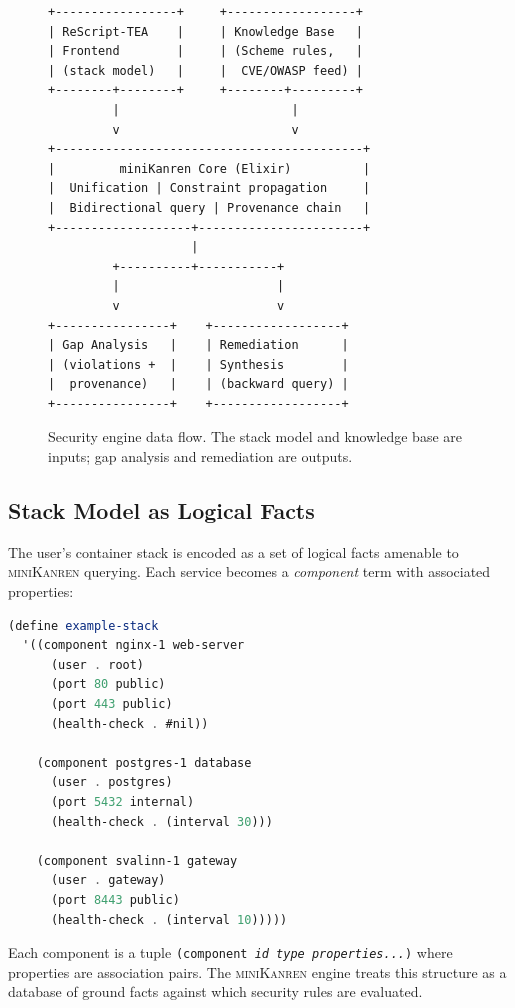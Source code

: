 \documentclass[11pt,twocolumn]{article}
\newcommand{\minikanren}{\textsc{miniKanren}\xspace}
\begin{document}
\begin{figure}[t]
\centering
\small
\begin{verbatim}
+-----------------+     +------------------+
| ReScript-TEA    |     | Knowledge Base   |
| Frontend        |     | (Scheme rules,   |
| (stack model)   |     |  CVE/OWASP feed) |
+--------+--------+     +--------+---------+
         |                        |
         v                        v
+-------------------------------------------+
|         miniKanren Core (Elixir)          |
|  Unification | Constraint propagation     |
|  Bidirectional query | Provenance chain   |
+-------------------+-----------------------+
                    |
         +----------+-----------+
         |                      |
         v                      v
+----------------+    +------------------+
| Gap Analysis   |    | Remediation      |
| (violations +  |    | Synthesis        |
|  provenance)   |    | (backward query) |
+----------------+    +------------------+
\end{verbatim}
\caption{Security engine data flow. The stack model and knowledge base
are inputs; gap analysis and remediation are outputs.}
\label{fig:engine-arch}
\end{figure}

\subsection{Stack Model as Logical Facts}
\label{sec:engine-model}

The user's container stack is encoded as a set of logical facts
amenable to \minikanren querying. Each service becomes a \emph{component}
term with associated properties:

\begin{lstlisting}[language=Scheme,caption={Stack model as logical
facts (Guile Scheme representation).},label=lst:stack-model]
(define example-stack
  '((component nginx-1 web-server
      (user . root)
      (port 80 public)
      (port 443 public)
      (health-check . #nil))

    (component postgres-1 database
      (user . postgres)
      (port 5432 internal)
      (health-check . (interval 30)))

    (component svalinn-1 gateway
      (user . gateway)
      (port 8443 public)
      (health-check . (interval 10)))))
\end{lstlisting}

Each component is a tuple \texttt{(component \emph{id type}
\emph{properties...})} where properties are association pairs. The
\minikanren engine treats this structure as a database of ground
facts against which security rules are evaluated.
\end{document}
